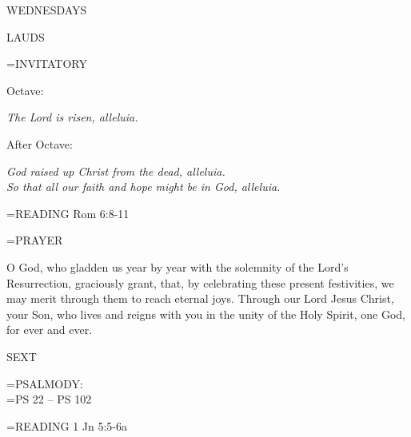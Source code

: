 \begin{center}
\normalsize \begin{center}\normalsize WEDNESDAYS\\
\end{center}
\end{center}

\begin{flushleft}\normalsize LAUDS\\\end{flushleft}

\hangindent=\parindent \small{INVITATORY}
\begin{center}
\end{center}Octave:\begin{center}\textit{	The Lord is risen, alleluia.\\}
\end{center}After Octave:\begin{center}\textit{	God raised up Christ from the dead, alleluia.\\}
\textit{So that all our faith and hope might be in God, alleluia.\\}
\end{center}

\hangindent=\parindent \small{READING}    Rom 6:8-11 \textbf{   \\}

\hangindent=\parindent \small PRAYER
\begin{description}[labelindent=\parindent, noitemsep, leftmargin=*]
\item [Octave:] 	O God, who gladden us year by year with the solemnity of the Lord's Resurrection, graciously grant, that, by celebrating these present festivities, we may merit through them to reach eternal joys. Through our Lord Jesus Christ, your Son, who lives and reigns with you in the unity of the Holy Spirit, one God, for ever and ever.
\item [After Octave:] 	
\end{description}

\begin{flushleft}\normalsize SEXT\\\end{flushleft}

\hangindent=\parindent \small{PSALMODY:}\\
\hangindent=\parindent  PS 22 -- PS 102\vspace{0.5em}

\hangindent=\parindent \small{READING}    1 Jn 5:5-6a \textbf{   }

